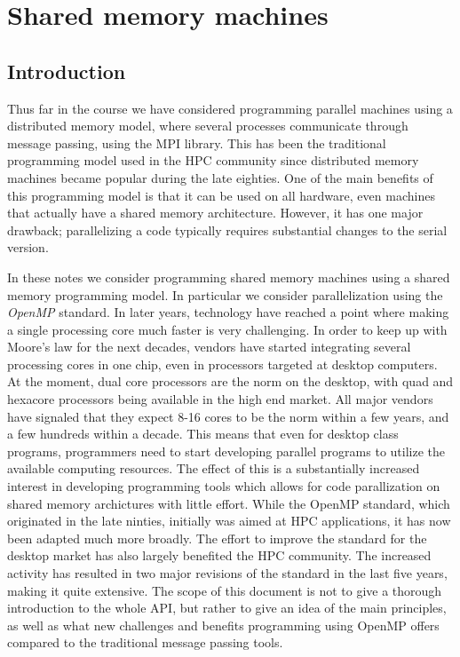 \lstset{inputpath=code/openmp/}

\chapter{Shared memory machines}

\section{Introduction}

Thus far in the course we have considered programming parallel machines using a
distributed memory model, where several processes communicate through message
passing, using the MPI library. This has been the traditional programming model
used in the HPC community since distributed memory machines became popular
during the late eighties. One of the main benefits of this programming model is
that it can be used on all hardware, even machines that actually have a shared
memory architecture. However, it has one major drawback; parallelizing a code
typically requires substantial changes to the serial version.

In these notes we consider programming shared memory machines using a shared
memory programming model. In particular we consider parallelization using the
\emph{OpenMP} standard. In later years, technology have reached a point where
making a single processing core much faster is very challenging. In order to
keep up with Moore's law for the next decades, vendors have started integrating
several processing cores in one chip, even in processors targeted at desktop
computers. At the moment, dual core processors are the norm on the desktop, with
quad and hexacore processors being available in the high end market. All major
vendors have signaled that they expect 8-16 cores to be the norm within a few
years, and a few hundreds within a decade. This means that even for desktop
class programs, programmers need to start developing parallel programs to
utilize the available computing resources. The effect of this is a substantially
increased interest in developing programming tools which allows for code
parallization on shared memory archictures with little effort. While the
OpenMP standard, which originated in the late ninties, initially was
aimed at HPC applications, it has now been adapted much more broadly. The effort
to improve the standard for the desktop market has also largely benefited the
HPC community. The increased activity has resulted in two major revisions of the
standard in the last five years, making it quite extensive. The scope of this
document is not to give a thorough introduction to the whole API, but rather to
give an idea of the main principles, as well as what new challenges and benefits
programming using OpenMP offers compared to the traditional message
passing tools.

